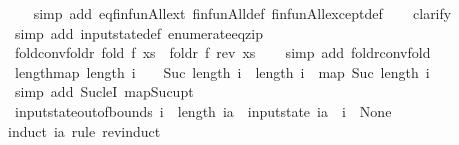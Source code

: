 \begin{isabellebody}
%
\isadelimproof
\ \ %
\endisadelimproof
%
\isatagproof
{}\isamarkupfalse%
\ {\isacharparenleft}simp\ add{\isacharcolon}\ eq{\isacharunderscore}finfun{\isacharunderscore}All{\isacharunderscore}ext\ finfun{\isacharunderscore}All{\isacharunderscore}def\ finfun{\isacharunderscore}All{\isacharunderscore}except{\isacharunderscore}def{\isacharparenright}\isanewline
\ \ \isamarkupfalse%
\ clarify\isanewline
\ \ \isamarkupfalse%
\ {\isacharparenleft}simp\ add{\isacharcolon}\ input{}state{\isacharunderscore}def\ enumerate{\isacharunderscore}eq{\isacharunderscore}zip{\isacharparenright}%
\endisatagproof
{\isafoldproof}%
%
\isadelimproof
\isanewline
%
\endisadelimproof
\isanewline
{}\isamarkupfalse%
\ fold{\isacharunderscore}conv{\isacharunderscore}foldr{\isacharcolon}\ {\isachardoublequoteopen}fold\ f\ xs\ {\isacharequal}\ foldr\ f\ {\isacharparenleft}rev\ xs{\isacharparenright}{\isachardoublequoteclose}\isanewline
%
\isadelimproof
\ \ %
\endisadelimproof
%
\isatagproof
{}\isamarkupfalse%
\ {\isacharparenleft}simp\ add{\isacharcolon}\ foldr{\isacharunderscore}conv{\isacharunderscore}fold{\isacharparenright}%
\endisatagproof
{\isafoldproof}%
%
\isadelimproof
\isanewline
%
\endisadelimproof
\isanewline
{}\isamarkupfalse%
\ length{\isacharunderscore}map{\isacharcolon}\ {\isachardoublequoteopen}length\ i\ {\isachargreater}\ {}\ {\isasymLongrightarrow}\ {\isacharbrackleft}Suc\ {}{\isachardot}{\isachardot}{\isacharless}length\ i{\isacharbrackright}\ {\isacharat}\ {\isacharbrackleft}length\ i{\isacharbrackright}\ {\isacharequal}\ map\ Suc\ {\isacharbrackleft}{}{\isachardot}{\isachardot}{\isacharless}length\ i{\isacharbrackright}{\isachardoublequoteclose}\isanewline
%
\isadelimproof
\ \ %
\endisadelimproof
%
\isatagproof
{}\isamarkupfalse%
\ {\isacharparenleft}simp\ add{\isacharcolon}\ Suc{\isacharunderscore}leI\ map{\isacharunderscore}Suc{\isacharunderscore}upt{\isacharparenright}%
\endisatagproof
{\isafoldproof}%
%
\isadelimproof
\isanewline
%
\endisadelimproof
\isanewline
{}\isamarkupfalse%
\ input{}state{\isacharunderscore}out{\isacharunderscore}of{\isacharunderscore}bounds{\isacharcolon}\ {\isachardoublequoteopen}i\ {\isasymge}\ length\ ia\ {\isasymLongrightarrow}\ input{}state\ ia\ {\isachardollar}\ i\ {\isacharequal}\ None{\isachardoublequoteclose}\isanewline
%
\isadelimproof
%
\endisadelimproof
%
\isatagproof
{}\isamarkupfalse%
{\isacharparenleft}induct\ ia\ rule{\isacharcolon}\ rev{\isacharunderscore}induct{\isacharparenright}\isanewline

\end{isabellebody}
